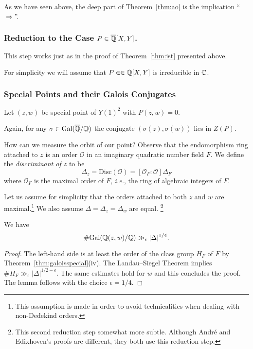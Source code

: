 As we have seen above, the deep part of Theorem~\ref{thm:ao} is the
implication
``$\Longrightarrow$''.

\subsubsection{Reduction to the Case $P \in {\overline{\mathbb{Q}}}[X,Y]$.}
This step works just as in the proof of Theorem~\ref{thm:ist}
presented above.

For simplicity we will assume that $P\in \in{\mathbb{Q}}[X,Y]$ is irreducible
in ${\mathbb{C}}$. 

\subsubsection{Special Points and their Galois Conjugates}

Let $(z,w)$ be special point of $Y(1)^2$ with $P(z,w)=0$.

Again, for any $\sigma\in \mathrm{Gal}({\overline{\mathbb{Q}}}/{\mathbb{Q}})$ the conjugate
$(\sigma(z),\sigma(w))$ lies in $Z(P)$.

How can we measure the orbit of our point? Observe that the
endomorphism ring attached to $z$ is an order $\mathcal{O}$ in an imaginary
quadratic number field $F$. We define the \emph{discriminant of $z$}
to be 
\begin{equation*}
  \Delta_z = \mathrm{Disc}(\mathcal{O}) = [\mathcal{O}_F:\mathcal{O}] \Delta_F
\end{equation*}
where $\mathcal{O}_F$ is the maximal order of $F$, \textit{i.e.}, the
ring of algebraic integers of $F$. 

Let us assume for simplicity that the orders attached to 
both $z$ and $w$ are maximal.\footnote{This assumption is made in
  order to avoid technicalities when dealing with non-Dedekind
  orders.}
We also assume $\Delta =
\Delta_z=\Delta_w$ are equal. \footnote{This second reduction step
  somewhat more subtle.
  Although Andr\'e and Edixhoven's proofs are different, they both use
  this reduction step.}

\begin{lemma}
  We have
  \begin{equation*}
    \# \mathrm{Gal}({\mathbb{Q}}(z,w)/{\mathbb{Q}}) \gg_\epsilon
    |\Delta|^{1/4}. 
  \end{equation*}
\end{lemma}
\begin{proof}
  The left-hand side is at least the order of the class group $H_F$ of $F$ by
  Theorem~\ref{thm:galoisspecial}(iv). The Landau--Siegel Theorem
  implies $\# H_F \gg_\epsilon |\Delta|^{1/2-\epsilon}$. 
  The same estimates hold for $w$ and this concludes the proof.
  The lemma follows with the choice $\epsilon =1/4$. 
\end{proof}

